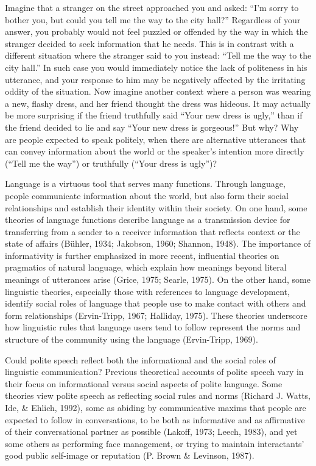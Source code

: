 \documentclass[oneside]{report}
\begin{document}
Imagine that a stranger on the street approached you and asked: ``I'm
sorry to bother you, but could you tell me the way to the city hall?''
Regardless of your answer, you probably would not feel puzzled or
offended by the way in which the stranger decided to seek information
that he needs. This is in contrast with a different situation where the
stranger said to you instead: ``Tell me the way to the city hall.'' In
such case you would immediately notice the lack of politeness in his
utterance, and your response to him may be negatively affected by the
irritating oddity of the situation. Now imagine another context where a
person was wearing a new, flashy dress, and her friend thought the dress
was hideous. It may actually be more surprising if the friend truthfully
said ``Your new dress is ugly,'' than if the friend decided to lie and
say ``Your new dress is gorgeous!'' But why? Why are people expected to
speak politely, when there are alternative utterances that can convey
information about the world or the speaker's intention more directly
(``Tell me the way'') or truthfully (``Your dress is ugly'')?

Language is a virtuous tool that serves many functions. Through
language, people communicate information about the world, but also form
their social relationships and establish their identity within their
society. On one hand, some theories of language functions describe
language as a transmission device for transferring from a sender to a
receiver information that reflects context or the state of affairs
(Bühler, 1934; Jakobson, 1960; Shannon, 1948). The importance of
informativity is further emphasized in more recent, influential theories
on pragmatics of natural language, which explain how meanings beyond
literal meanings of utterances arise (Grice, 1975; Searle, 1975). On the
other hand, some linguistic theories, especially those with references
to language development, identify social roles of language that people
use to make contact with others and form relationships (Ervin-Tripp,
1967; Halliday, 1975). These theories underscore how linguistic rules
that language users tend to follow represent the norms and structure of
the community using the language (Ervin-Tripp, 1969).

Could polite speech reflect both the informational and the social roles
of linguistic communication? Previous theoretical accounts of polite
speech vary in their focus on informational versus social aspects of
polite language. Some theories view polite speech as reflecting social
rules and norms (Richard J. Watts, Ide, \& Ehlich, 1992), some as
abiding by communicative maxims that people are expected to follow in
conversations, to be both as informative and as affirmative of their
conversational partner as possible (Lakoff, 1973; Leech, 1983), and yet
some others as performing face management, or trying to maintain
interactants' good public self-image or reputation (P. Brown \&
Levinson, 1987).
\end{document}
